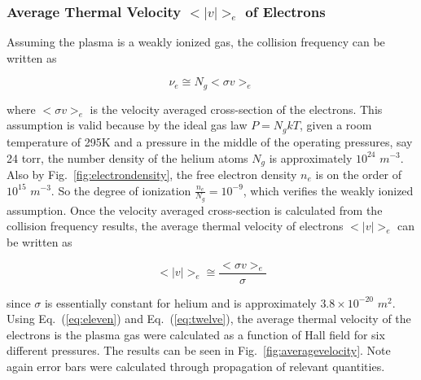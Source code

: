 \documentclass[%
 aip,
rsi,%
 amsmath,amssymb,
 reprint,%
author-numerical,%
]{revtex4-1}
\begin{document}
\subsubsection{Average Thermal Velocity $ < | v | > _ { e }$ of Electrons}
Assuming the plasma is a weakly ionized gas, the collision frequency can be written as 

\begin{equation}
\nu _ { e } \cong N _ { g } < \sigma v > _ { e }
\label{eq:eleven}
\end{equation}

\noindent where $< \sigma v > _ { e }$ is the velocity averaged cross-section of the electrons. This assumption is valid because by the ideal gas law $P = N _ { g } k T$, given a room temperature of 295K and a pressure in the middle of the operating pressures, say 24 torr, the number density of the helium atoms $N_{g}$ is approximately $10 ^ { 24 }$ $m ^ { - 3 }$. Also by Fig.~\ref{fig:electrondensity}, the free electron density $n_{e}$ is on the order of $10 ^ { 15 }$ $m ^ { - 3 }$. So the degree of ionization $\frac{n_{e}}{N_{g}}=10 ^ { -9 }$, which verifies the weakly ionized assumption.\newline
\indent Once the velocity averaged cross-section is calculated from the collision frequency results, the average thermal velocity of electrons $ < | v | > _ { e }$ can be written as 

\begin{equation}
< | v | > _ { e } \cong \frac{< \sigma v > _ { e }}{\sigma }
\label{eq:twelve}
\end{equation}

\noindent since $\sigma$ is essentially constant for helium and is approximately $3.8\times 10^{-20}$ $m^{2}$. \newline
\indent Using Eq.~(\ref{eq:eleven}) and Eq.~(\ref{eq:twelve}), the average thermal velocity of the electrons is the plasma gas were calculated as a function of Hall field for six different pressures. The results can be seen in Fig.~\ref{fig:averagevelocity}. Note again error bars were calculated through propagation of relevant quantities. 
\end{document}
